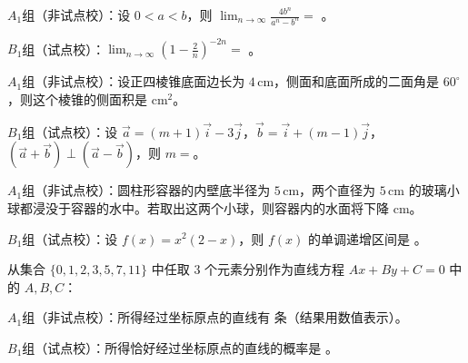\begin{question}

$A_1$组（非试点校）：设 $0<a<b$，则 $\displaystyle\lim_{n\to\infty}\frac{4b^n}{a^n-b^n}=$ \gkblank{}。

$B_1$组（试点校）：$\displaystyle\lim_{n\to\infty}\left(1-\frac2n\right)^{-2n}=$ \gkblank{}。

\end{question}
\begin{question}

$A_1$组（非试点校）：设正四棱锥底面边长为 $4\,\mathrm{cm}$，侧面和底面所成的二面角是 $60^\circ$，则这个棱锥的侧面积是 \gkblank{} $\mathrm{cm}^2$。

$B_1$组（试点校）：设 $\vec a=(m+1)\vec i-3\vec j$，$\vec b=\vec i+(m-1)\vec j$，$(\vec a+\vec b)\perp(\vec a-\vec b)$，则 $m=$\gkblank{}。

\end{question}
\begin{question}

$A_1$组（非试点校）：圆柱形容器的内壁底半径为 $5\,\mathrm{cm}$，两个直径为 $5\,\mathrm{cm}$ 的玻璃小球都浸没于容器的水中。若取出这两个小球，则容器内的水面将下降 \gkblank{} $\mathrm{cm}$。

$B_1$组（试点校）：设 $f(x)=x^2(2-x)$，则 $f(x)$ 的单调递增区间是 \gkblank{}。

\end{question}
\begin{question}
从集合 $\{0,1,2,3,5,7,11\}$ 中任取 3 个元素分别作为直线方程 $Ax+By+C=0$ 中的 $A,B,C$：

$A_1$组（非试点校）：所得经过坐标原点的直线有 \gkblank{} 条（结果用数值表示）。

$B_1$组（试点校）：所得恰好经过坐标原点的直线的概率是 \gkblank{}。

\end{question}

